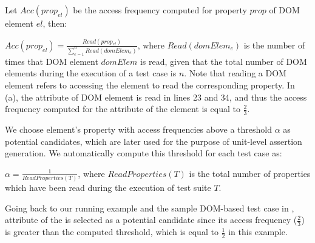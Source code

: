 Let $Acc(prop_{el})$ be the access frequency computed for property $prop$ of DOM element $el$, then:
 
$Acc(prop_{el})=\frac{Read(prop_{el})}{\sum _{e=1}^{n} Read(domElem_e)}$, where $Read(domElem_{e})$ is the number of times that DOM element $domElem$ is read, given that the total number of DOM elements during the execution of a test case is $n$.
Note that reading a DOM element refers to accessing the element to read the corresponding property. In (a), the  attribute of DOM element  is read in lines 23 and 34, and thus the access frequency
computed for the  attribute of the element is equal to $\frac{2}{3}$.

We choose element's property with access frequencies above a threshold $\alpha$ as potential candidates, which are later used for the purpose of unit-level assertion generation. We automatically compute this threshold for each test case as: 

$\alpha=\frac{1}{ReadProperties(T)}$, where $ReadProperties(T)$ is the total number of properties which have been read during the execution of test suite $T$.

Going back to our running example and the sample DOM-based test case in ,  attribute of the  is selected as a potential candidate since its access frequency ($\frac{2}{3}$) is greater than the computed threshold, which is equal to $\frac{1}{2}$ in this example.        
